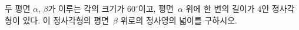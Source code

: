 두 평면 $\alpha$, $\beta$가 이루는 각의 크기가 $60^\circ$이고, 평면~$\alpha$ 위에 한 변의 길이가 $4$인 정사각형이 있다. 이 정사각형의 평면~$\beta$ 위로의 정사영의 넓이를 구하시오.
